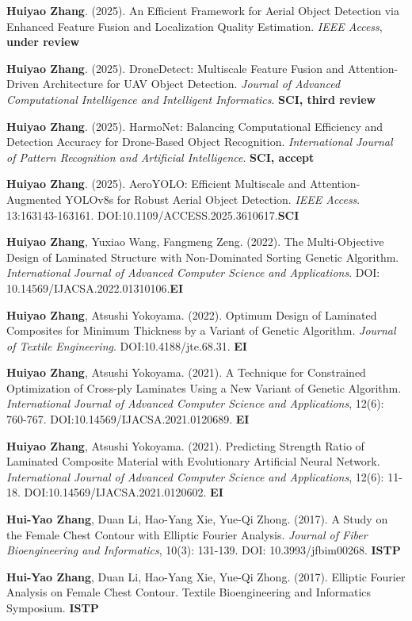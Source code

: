 
	\textbf{Huiyao Zhang}. (2025). An Efficient Framework for Aerial Object Detection via Enhanced Feature Fusion and
	Localization Quality Estimation. \textit{IEEE Access}, \textbf{under review}
    
	\textbf{Huiyao Zhang}. (2025). DroneDetect: Multiscale Feature Fusion and Attention-Driven Architecture for UAV Object
	Detection. \textit{Journal of Advanced Computational Intelligence and Intelligent Informatics}. \textbf{SCI, third review} 

	\textbf{Huiyao Zhang}. (2025). HarmoNet: Balancing Computational Efficiency and Detection Accuracy for Drone-Based Object
	Recognition. \textit{International Journal of Pattern Recognition and Artificial Intelligence}. \textbf{SCI, accept} 

	\textbf{Huiyao Zhang}. (2025). AeroYOLO: Efficient Multiscale and Attention-Augmented YOLOv8s for Robust Aerial Object
	Detection. \textit{IEEE Access}. 13:163143-163161. DOI:10.1109/ACCESS.2025.3610617.\textbf{SCI}

	\textbf{Huiyao Zhang}, Yuxiao Wang, Fangmeng Zeng. (2022). The Multi-Objective Design of Laminated Structure with
	Non-Dominated Sorting Genetic Algorithm. \textit{International Journal of Advanced Computer Science and
	Applications}.  DOI: 10.14569/IJACSA.2022.01310106.\textbf{EI}

	\textbf{Huiyao Zhang}, Atsushi Yokoyama. (2022). Optimum Design of Laminated Composites for Minimum Thickness by a
	Variant of Genetic Algorithm. \textit{Journal of Textile Engineering}. DOI:10.4188/jte.68.31. \textbf{EI}
	
	\textbf{Huiyao Zhang}, Atsushi Yokoyama. (2021). A Technique for Constrained Optimization of Cross-ply Laminates
	Using a New Variant of Genetic Algorithm. \textit{International Journal of Advanced Computer Science and
	Applications}, 12(6): 760-767. DOI:10.14569/IJACSA.2021.0120689. \textbf{EI}

	\textbf{Huiyao Zhang}, Atsushi Yokoyama. (2021). Predicting Strength Ratio of Laminated Composite Material with
	Evolutionary Artificial Neural Network. \textit{International Journal of Advanced Computer Science and
	Applications}, 12(6): 11-18. DOI:10.14569/IJACSA.2021.0120602. \textbf{EI}

	\textbf{Hui-Yao Zhang}, Duan Li, Hao-Yang Xie, Yue-Qi Zhong. (2017).  A Study on the Female Chest Contour with
	Elliptic Fourier Analysis. \textit{Journal of Fiber Bioengineering and Informatics}, 10(3): 131-139. DOI:
	10.3993/jfbim00268. \textbf{ISTP}

	\textbf{Hui-Yao Zhang}, Duan Li, Hao-Yang Xie, Yue-Qi Zhong. (2017).  Elliptic Fourier Analysis on Female Chest
	Contour. Textile Bioengineering and Informatics Symposium. \textbf{ISTP}

